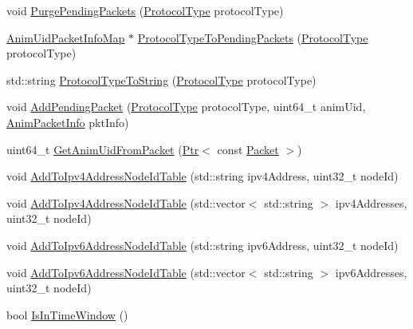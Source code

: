 \begin{DoxyCompactItemize}
\item 
void \hyperlink{classns3_1_1AnimationInterface_a5dcf3b2c796d0c784842a10365d23b99}{Purge\+Pending\+Packets} (\hyperlink{classns3_1_1AnimationInterface_a801a4efd553ff0d1d768cd70d22456b6}{Protocol\+Type} protocol\+Type)
\item 
\hyperlink{classns3_1_1AnimationInterface_afea577896009c4134df836bc20f1eabe}{Anim\+Uid\+Packet\+Info\+Map} $\ast$ \hyperlink{classns3_1_1AnimationInterface_a3785f870e7f29eb0ea0b843327fad5bb}{Protocol\+Type\+To\+Pending\+Packets} (\hyperlink{classns3_1_1AnimationInterface_a801a4efd553ff0d1d768cd70d22456b6}{Protocol\+Type} protocol\+Type)
\item 
std\+::string \hyperlink{classns3_1_1AnimationInterface_a1b901b34acadaa3c35433083d542dd19}{Protocol\+Type\+To\+String} (\hyperlink{classns3_1_1AnimationInterface_a801a4efd553ff0d1d768cd70d22456b6}{Protocol\+Type} protocol\+Type)
\item 
void \hyperlink{classns3_1_1AnimationInterface_ab7f3bc1843610f2d9514ddf5d756eaa5}{Add\+Pending\+Packet} (\hyperlink{classns3_1_1AnimationInterface_a801a4efd553ff0d1d768cd70d22456b6}{Protocol\+Type} protocol\+Type, uint64\+\_\+t anim\+Uid, \hyperlink{classns3_1_1AnimationInterface_1_1AnimPacketInfo}{Anim\+Packet\+Info} pkt\+Info)
\item 
uint64\+\_\+t \hyperlink{classns3_1_1AnimationInterface_a18e6a184ccd7dee800bf734f8adc818c}{Get\+Anim\+Uid\+From\+Packet} (\hyperlink{classns3_1_1Ptr}{Ptr}$<$ const \hyperlink{classns3_1_1Packet}{Packet} $>$)
\item 
void \hyperlink{classns3_1_1AnimationInterface_a6393d37e753d3445d8915a4f3bc748c7}{Add\+To\+Ipv4\+Address\+Node\+Id\+Table} (std\+::string ipv4\+Address, uint32\+\_\+t node\+Id)
\item 
void \hyperlink{classns3_1_1AnimationInterface_a35b177734171fb308ccb7e4968f000e6}{Add\+To\+Ipv4\+Address\+Node\+Id\+Table} (std\+::vector$<$ std\+::string $>$ ipv4\+Addresses, uint32\+\_\+t node\+Id)
\item 
void \hyperlink{classns3_1_1AnimationInterface_a77ab25cf252dc135989298d9c96d452b}{Add\+To\+Ipv6\+Address\+Node\+Id\+Table} (std\+::string ipv6\+Address, uint32\+\_\+t node\+Id)
\item 
void \hyperlink{classns3_1_1AnimationInterface_a3f5e479bf642c3e858fd40b2eea9f59a}{Add\+To\+Ipv6\+Address\+Node\+Id\+Table} (std\+::vector$<$ std\+::string $>$ ipv6\+Addresses, uint32\+\_\+t node\+Id)
\item 
bool \hyperlink{classns3_1_1AnimationInterface_a5a226f9ac5bb71b354c908ad457180a7}{Is\+In\+Time\+Window} ()

\end{DoxyCompactItemize}
